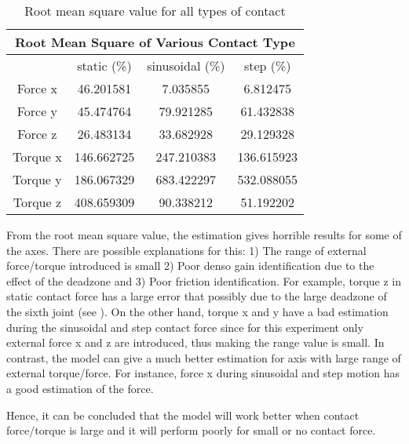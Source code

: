 \begin{table}[H]
    \centering
    \begin{tabular}{| c | c | c | c |}
    \hline
    \multicolumn{4}{|c|}{Root Mean Square of Various Contact Type} \\\hline
              & static (\%) & sinusoidal (\%)  & step (\%)    \\ \hline
    Force x   &  46.201581  &  7.035855       & 6.812475    \\ \hline
    Force y   &  45.474764  &    79.921285     & 61.432838   \\ \hline
    Force z   &  26.483134  &   33.682928      & 29.129328   \\ \hline
    Torque x  &  146.662725  &  247.210383     & 136.615923  \\ \hline
    Torque y  &  186.067329  &   683.422297     & 532.088055 \\ \hline
    Torque z  &  408.659309  &  90.338212      & 51.192202 \\ \hline
    \end{tabular}
    \caption{Root mean square value for all types of contact}
    \label{table:rmse 2}
\end{table}

From the root mean square value, the estimation gives horrible results for some of the axes. There are  possible explanations for this: 1) The range of external force/torque introduced is small 2) Poor denso gain identification due to the effect of the deadzone and 3) Poor friction identification. For example, torque z in static contact force has a large error that possibly due to the large deadzone of the sixth joint (see ). On the other hand, torque x and y have a bad estimation during the sinusoidal and step contact force since for this experiment only external force x and z are introduced, thus making the range value is small. In contrast, the model can give a much better estimation for axis with large range of external torque/force. For instance, force x during sinusoidal and step motion has a good estimation of the force. 

Hence, it can be concluded that the model will work better when contact force/torque is large and it will perform poorly for small or no contact force. 
